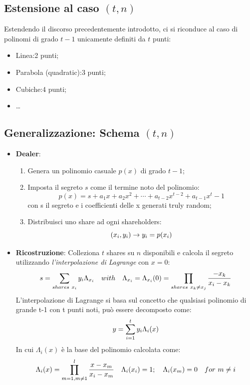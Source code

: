 \documentclass{book}
\begin{document}
\subsection{Estensione al caso \((t,n)\)}
Estendendo il discorso precedentemente introdotto, ci si riconduce al caso di polinomi di grado \(t-1\) unicamente definiti da \(t\) punti:
\begin{itemize}
	\item Linea:\@2 punti;
	\item Parabola (quadratic):\@3 punti;
	\item Cubiche:\@4 punti;
	\item \dots
\end{itemize}
\subsection{Generalizzazione: Schema \((t,n)\)}
\begin{itemize}
	\item \textbf{Dealer}:\
	      \begin{enumerate}
		      \item Genera un polinomio casuale \(p(x)\) di grado \(t-1\);
		      \item Imposta il segreto \(s\) come il termine noto del polinomio:
		            \begin{equation*}
			            p(x)=s+a_{1}x+a_{2}x^{2}+ \cdots +a_{t-2}x^{t-2}+a_{t-1}x^t-1
		            \end{equation*}
		            con s il segreto e i coefficienti delle x generati truly random;
		      \item Distribuisci uno share ad ogni shareholders:
		            \begin{equation*}
			            \centering
			            (x_{i},y_{i})\rightarrow y_{i}=p(x_{i})
		            \end{equation*}
	      \end{enumerate}
	\item \textbf{Ricostruzione}: Colleziona \(t\) shares su \(n\) disponibili e calcola il segreto utilizzando \emph{l'interpolazione di Lagrange} con \(x=0\):
	      \begin{equation*}
		      \centering
		      s=\sum_{shares\ x_i}{y_{i}\Lambda_{x_{i}}}\quad with\quad\Lambda_{x_{i}}=\Lambda_{x_{i}}(0)=\prod_{shares\ x_{k}\neq x_{j}}{\frac{-x_{k}}{x_{i}-x_{k}}}
	      \end{equation*}
	      L'interpolazione di Lagrange si basa sul concetto che qualsiasi polinomio di grande t-1 con t punti noti, può essere decomposto come:
	      \begin{equation*}
		      \centering
		      y=\sum_{i=1}^{t}{y_{i}\Lambda_{i}(x)}
	      \end{equation*}
	      In cui \(\Lambda_{i}(x)\) è la base del polinomio calcolata come:
	      \begin{equation*}
		      \centering
		      \Lambda_{i}(x)=\prod_{m=1,m\neq1}^{l}{\frac{x-x_{m}}{x_{i}-x_{m}}}\quad \Lambda_{i}(x_{i})=1;\quad \Lambda_{i}(x_{m})=0\quad for\ m\neq i
	      \end{equation*}
\end{itemize}
\end{document}

